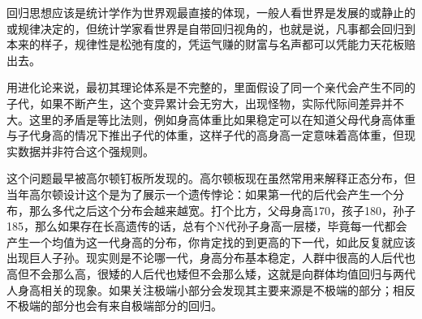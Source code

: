 \documentclass[]{tufte-book}
\begin{document}
回归思想应该是统计学作为世界观最直接的体现，一般人看世界是发展的或静止的或规律决定的，但统计学家看世界是自带回归视角的，也就是说，凡事都会回归到本来的样子，规律性是松弛有度的，凭运气赚的财富与名声都可以凭能力天花板赔出去。

用进化论来说，最初其理论体系是不完整的，里面假设了同一个亲代会产生不同的子代，如果不断产生，这个变异累计会无穷大，出现怪物，实际代际间差异并不大。这里的矛盾是等比法则，例如身高体重比如果稳定可以在知道父母代身高体重与子代身高的情况下推出子代的体重，这样子代的高身高一定意味着高体重，但现实数据并非符合这个强规则。

这个问题最早被高尔顿钉板所发现的。高尔顿板现在虽然常用来解释正态分布，但当年高尔顿设计这个是为了展示一个遗传悖论：如果第一代的后代会产生一个分布，那么多代之后这个分布会越来越宽。打个比方，父母身高170，孩子180，孙子185，那么如果存在长高遗传的话，总有个N代孙子身高一层楼，毕竟每一代都会产生一个均值为这一代身高的分布，你肯定找的到更高的下一代，如此反复就应该出现巨人子孙。现实则是不论哪一代，身高分布基本稳定，人群中很高的人后代也高但不会那么高，很矮的人后代也矮但不会那么矮，这就是向群体均值回归与两代人身高相关的现象。如果关注极端小部分会发现其主要来源是不极端的部分；相反不极端的部分也会有来自极端部分的回归。
\end{document}
